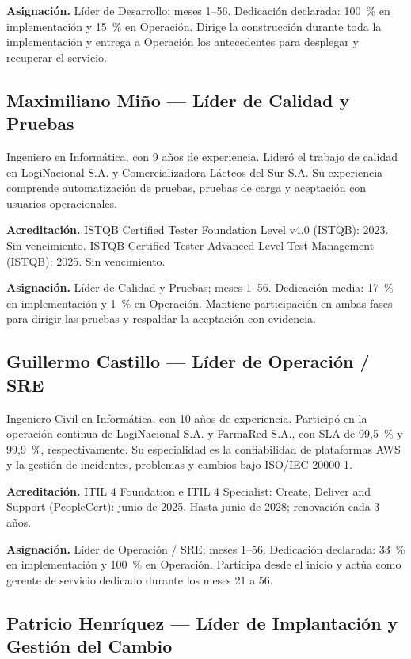 \textbf{Asignación.} Líder de Desarrollo; meses 1--56. Dedicación declarada: 100~\% en implementación y 15~\% en Operación. Dirige la construcción durante toda la implementación y entrega a Operación los antecedentes para desplegar y recuperar el servicio.

\subsection{Maximiliano Miño — Líder de Calidad y Pruebas}

Ingeniero en Informática, con 9 años de experiencia. Lideró el trabajo de calidad en LogiNacional S.A. y Comercializadora Lácteos del Sur S.A. Su experiencia comprende automatización de pruebas, pruebas de carga y aceptación con usuarios operacionales.

\textbf{Acreditación.} ISTQB Certified Tester Foundation Level v4.0 (ISTQB): 2023. Sin vencimiento. ISTQB Certified Tester Advanced Level Test Management (ISTQB): 2025. Sin vencimiento.

\textbf{Asignación.} Líder de Calidad y Pruebas; meses 1--56. Dedicación media: 17~\% en implementación y 1~\% en Operación. Mantiene participación en ambas fases para dirigir las pruebas y respaldar la aceptación con evidencia.

\subsection{Guillermo Castillo — Líder de Operación / SRE}

Ingeniero Civil en Informática, con 10 años de experiencia. Participó en la operación continua de LogiNacional S.A. y FarmaRed S.A., con SLA de 99,5~\% y 99,9~\%, respectivamente. Su especialidad es la confiabilidad de plataformas AWS y la gestión de incidentes, problemas y cambios bajo ISO/IEC 20000-1.

\textbf{Acreditación.} ITIL 4 Foundation e ITIL 4 Specialist: Create, Deliver and Support (PeopleCert): junio de 2025. Hasta junio de 2028; renovación cada 3 años.

\textbf{Asignación.} Líder de Operación / SRE; meses 1--56. Dedicación declarada: 33~\% en implementación y 100~\% en Operación. Participa desde el inicio y actúa como gerente de servicio dedicado durante los meses 21 a 56.

\subsection{Patricio Henríquez — Líder de Implantación y Gestión del Cambio}

